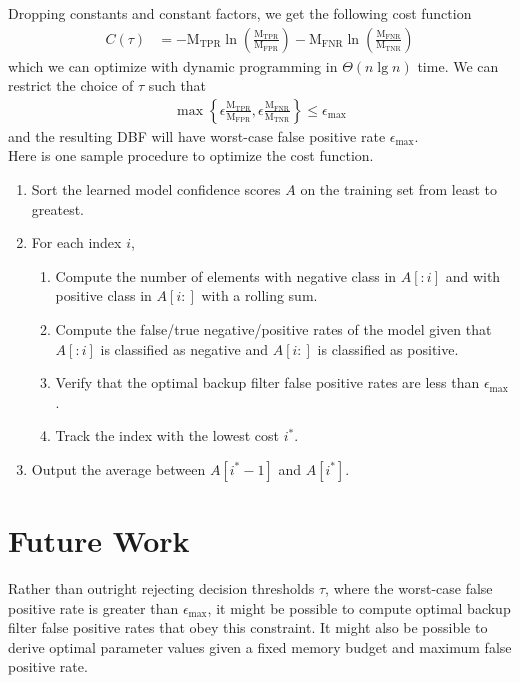 \documentclass{article}
\begin{document}
\noindent
Dropping constants and constant factors, we get the following cost function
\begin{align*}
    C(\tau) &= -\text{M}_\text{TPR} \ln \left( \frac{\text{M}_\text{TPR}}{\text{M}_\text{FPR}} \right) 
 - \text{M}_\text{FNR} \ln \left( \frac{\text{M}_\text{FNR}}{\text{M}_\text{TNR}}\right)
\end{align*}
which we can optimize with dynamic programming in $\Theta(n \lg n)$ time. We can restrict the choice of $\tau$ such that 
\begin{align}
    \max\left\{\epsilon\frac{\text{M}_\text{TPR}}{\text{M}_\text{FPR}}, \epsilon \frac{\text{M}_\text{FNR}}{\text{M}_\text{TNR}} \right\} \leq \epsilon_\text{max}
\end{align}
and the resulting DBF will have worst-case false positive rate $\epsilon_\text{max}$. \\

\noindent
Here is one sample procedure to optimize the cost function.
\begin{enumerate}
    \item Sort the learned model confidence scores $A$ on the training set from least to greatest.
    \item For each index $i$,
    \begin{enumerate}
        \item Compute the number of elements with negative class in $A[:i]$ and with positive class in $A[i:]$ with a rolling sum. 
        \item Compute the false/true negative/positive rates of the model given that $A[:i]$ is classified as negative and $A[i:]$ is classified as positive.
        \item Verify that the optimal backup filter false positive rates are less than $\epsilon_\text{max}$.
        \item Track the index with the lowest cost $i^*$.
    \end{enumerate}
    \item Output the average between $A[i^* - 1]$ and $A[i^*]$.
\end{enumerate}

\section{Future Work}

Rather than outright rejecting decision thresholds $\tau$, where the worst-case false positive rate is greater than $\epsilon_\text{max}$, it might be possible to compute optimal backup filter false positive rates that obey this constraint. It might also be possible to derive optimal parameter values given a fixed memory budget and maximum false positive rate. 

\printbibliography
\end{document}
